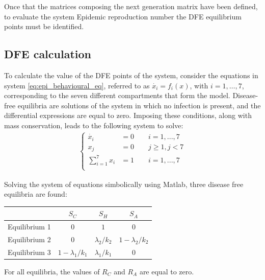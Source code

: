 Once that the matrices composing the next generation matrix have been defined, to evaluate the system Epidemic reproduction number the DFE equilibrium points must be identified.

\subsection{DFE calculation}
To calculate the value of the DFE points of the system, consider the equations in system \ref{eq:epi_behavioural_eq}, referred to as $\dot{x_i} = f_i(x)$, with $i = 1,\dots,7$, corresponding to the seven different compartments that form the model.
Disease-free equilibria are solutions of the system in which no infection is present, and the differential expressions are equal to zero. Imposing these conditions, along with mass conservation, leads to the following system to solve:
\begin{align*}
	\begin{cases} 
		\dot{x_i} &= 0  \quad \quad   i = 1,...,7\\
		x_j &= 0	\quad \quad	 j \ge 1, j <7	\\
		\sum_{i = 1}^{7} x_i&= 1 \quad \quad i = 1,...,7 \\
	\end{cases}
	\label{eq:epi_behavioural_eq}
\end{align*}

Solving the system of equations simbolically using Matlab, three disease free equilibria are found:
\begin{center}
\begin{tabular}{|c|c|c|c|}
	\hline
	& $S_C$ & $S_H$ & $S_A$ \\
	\hline
	Equilibrium 1 & $0$ & $1$ & $0$ \\
	\hline
	Equilibrium 2 & $0$ & $\lambda_2/k_2$ & $1- \lambda_2/k_2$ \\
	\hline
	Equilibrium 3 & $1 -\lambda_1/k_1$ & $\lambda_1/k_1$ & $0$ \\
	\hline
\end{tabular}
\end{center}
For all equilibria, the values of $R_C$ and $R_A$ are equal to zero.

